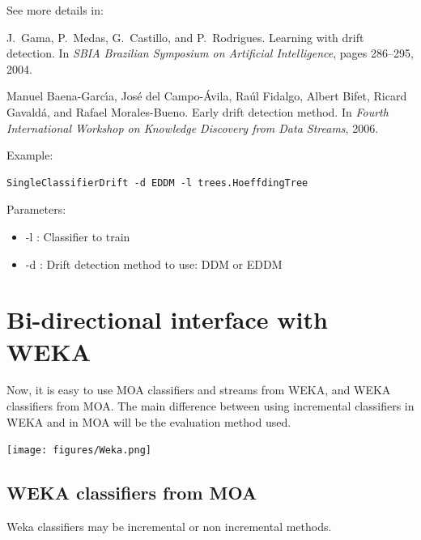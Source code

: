 \documentclass[a4paper,12pt,twoside]{book}
\begin{document}
See more details in:

\begin{itemize}
J.~Gama, P.~Medas, G.~Castillo, and P.~Rodrigues.
\newblock Learning with drift detection.
\newblock In {\em SBIA Brazilian Symposium on Artificial Intelligence}, pages
  286--295, 2004.

Manuel Baena-Garc\'{\i}a, Jos{\'e} del Campo-{\'A}vila, Ra\'ul Fidalgo, Albert
  Bifet, Ricard Gavald\'a, and Rafael Morales-Bueno.
\newblock Early drift detection method.
\newblock In {\em Fourth International Workshop on Knowledge Discovery from
  Data Streams}, 2006.\end{itemize}

Example:
\begin{footnotesize}\begin{verbatim}
SingleClassifierDrift -d EDDM -l trees.HoeffdingTree
\end{verbatim}\end{footnotesize}

Parameters:
\begin{itemize}
\item -l : Classifier to train
\item -d : Drift detection method to use: DDM or EDDM
\end{itemize}



\chapter{Bi-directional interface with WEKA}
\label{chap:Weka}

Now, it is easy to use MOA classifiers and streams from WEKA, and WEKA classifiers from MOA.
The main difference between using incremental classifiers in WEKA and in MOA will be the evaluation method used.

\begin{center}
\texttt{[image: figures/Weka.png]}\end{center}

\section{WEKA classifiers from MOA}

Weka classifiers may be incremental or non incremental methods.
\end{document}
